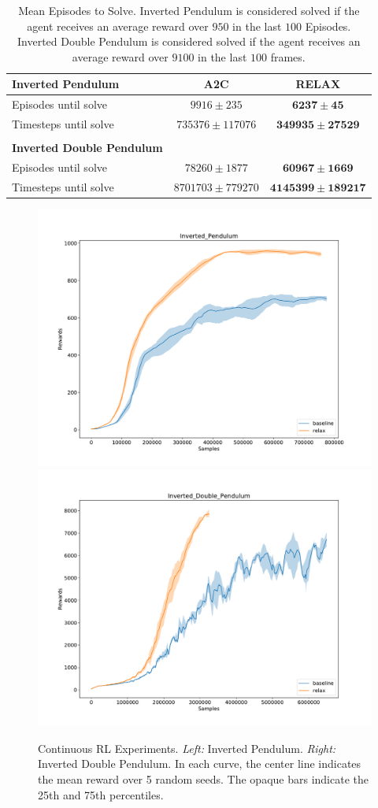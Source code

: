 \documentclass{article}
\begin{document}
\begin{table}[h]
	\centering
	\begin{tabular}{l c c} 
		\textbf{Inverted Pendulum} & A2C & RELAX \\\midrule
		Episodes until solve      & $9916 \pm 235$ & $\bm{6237 \pm 45}$ \\
		Timesteps until solve    & $735376 \pm 117076$ & $\bm{349935 \pm 27529}$ \\\\
		\textbf{Inverted Double Pendulum}\\ \midrule
		Episodes until solve & $78260 \pm 1877$ & $\bm{60967 \pm 1669}$\\
		Timesteps until solve    & $8701703 \pm 779270$ & $\bm{4145399 \pm 189217}$  
	\end{tabular}
	\caption{Mean Episodes to Solve. Inverted Pendulum is considered solved if the agent receives an average reward over $950$ in the last $100$ Episodes. Inverted Double Pendulum is considered solved if the agent receives an average reward over $9100$ in the last $100$ frames.}
	\label{tab:cont_rl}
\end{table}

\begin{figure}[h]
	\centering
	\includegraphics[width=.4\textwidth]{figures/Inverted_Pendulum_A2C}
	\includegraphics[width=.4\textwidth]{figures/Inverted_Double_Pendulum_A2C}
	\caption{Continuous RL Experiments. \emph{Left:} Inverted Pendulum. \emph{Right:} Inverted Double Pendulum. In each curve, the center line indicates the mean reward over 5 random seeds. The opaque bars indicate the 25th and 75th percentiles.}
	\label{fig:cont_rl}
\end{figure}
\end{document}
